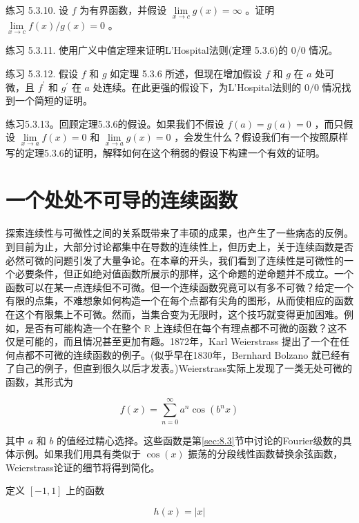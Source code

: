 练习 5.3.10. 设 \(f\) 为有界函数，并假设 \(\mathop{\lim }\limits_{{x \rightarrow  c}}g\left( x\right)  = \infty\) 。证明 \(\mathop{\lim }\limits_{{x \rightarrow  c}}f\left( x\right) /g\left( x\right)  = 0\) 。

练习 5.3.11. 使用广义中值定理来证明L'Hospital法则(定理 5.3.6)的 0/0 情况。

练习 5.3.12. 假设 \(f\) 和 \(g\) 如定理 5.3.6 所述，但现在增加假设 \(f\) 和 \(g\) 在 \(a\) 处可微，且 \({f}^{\prime }\) 和 \({g}^{\prime }\) 在 \(a\) 处连续。在此更强的假设下，为L'Hospital法则的 \(0/0\) 情况找到一个简短的证明。

练习5.3.13。回顾定理5.3.6的假设。如果我们不假设 \(f\left( a\right)  = g\left( a\right)  = 0\) ，而只假设 \(\mathop{\lim }\limits_{{x \rightarrow  a}}f\left( x\right)  = 0\) 和 \(\mathop{\lim }\limits_{{x \rightarrow  a}}g\left( x\right)  = 0\) ，会发生什么？假设我们有一个按照原样写的定理5.3.6的证明，解释如何在这个稍弱的假设下构建一个有效的证明。

\section{一个处处不可导的连续函数}
\label{sec:5.4}
探索连续性与可微性之间的关系既带来了丰硕的成果，也产生了一些病态的反例。到目前为止，大部分讨论都集中在导数的连续性上，但历史上，关于连续函数是否必然可微的问题引发了大量争论。在本章的开头，我们看到了连续性是可微性的一个必要条件，但正如绝对值函数所展示的那样，这个命题的逆命题并不成立。一个函数可以在某一点连续但不可微。但一个连续函数究竟可以有多不可微？给定一个有限的点集，不难想象如何构造一个在每个点都有尖角的图形，从而使相应的函数在这个有限集上不可微。然而，当集合变为无限时，这个技巧就变得更加困难。例如，是否有可能构造一个在整个 \(\mathbb{R}\) 上连续但在每个有理点都不可微的函数？这不仅是可能的，而且情况甚至更加有趣。1872年，Karl Weierstrass 提出了一个在任何点都不可微的连续函数的例子。(似乎早在1830年，Bernhard Bolzano 就已经有了自己的例子，但直到很久以后才发表。)Weierstrass实际上发现了一类无处可微的函数，其形式为

\[
f\left( x\right)  = \mathop{\sum }\limits_{{n = 0}}^{\infty }{a}^{n}\cos \left( {{b}^{n}x}\right)
\]

其中 \(a\) 和 \(b\) 的值经过精心选择。这些函数是第\ref{sec:8.3}节中讨论的Fourier级数的具体示例。如果我们用具有类似于 \(\cos \left( x\right)\) 振荡的分段线性函数替换余弦函数，Weierstrass论证的细节将得到简化。


定义 $[-1,1]$ 上的函数

\[
h\left( x\right)  = \left| x\right|
\]

